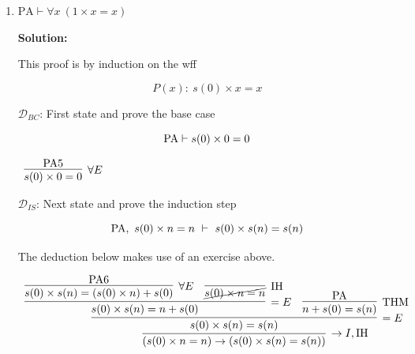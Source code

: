 \documentclass[11pt]{report}
\begin{document}
\begin{enumerate}
\begin{enumerate}
		$\mathcal{D}_{IS}$: Next state and prove the induction step

		$$ \PA, \ 0 \times n = 0 \ \vdash \ 0 \times s(n) = 0$$

		\begin{mdframed}
			\begin{center}
				$\begin{array}{c}
					\infer[\to I, \IH]{(0 \times n = 0) \to (0 \times s(n) = 0)}
						{\infer[=E]{0 \times s(n) = 0}
							{\infer[=E]{0 \times s(n) = 0 \times n}
								{\infer[\forall E]{0 \times s(n) = 0 \times n + 0}{\PA 6}
								&
								\infer[\forall E]{0 \times n + 0 = 0\times n}{\PA 3}}
							&
							\infer[\IH]{\cancel{0 \times n = 0}}{}}}
				\end{array}$
			\end{center}
		\end{mdframed}
		
		\newpage
		\item $\text{PA} \vdash \forall x \ (1 \times x = x)$

		{\bf Solution:} 

		This proof is by induction on the wff 

		$$ P(x) : \ s(0) \times x = x$$

		$\mathcal{D}_{BC}$: First state and prove the base case 

		$$ \text{PA} \vdash s(0) \times 0 = 0$$

		\begin{mdframed}
			\begin{center}
				$\begin{array}{c}
					\infer[\forall E]{s(0)\times 0 = 0}
						{\PA 5}
				\end{array}$
			\end{center}
		\end{mdframed}

		$\mathcal{D}_{IS}$: Next state and prove the induction step

		$$ \PA, \ s(0)\times n = n \ \vdash \ s(0)\times s(n) = s(n)$$

		The deduction below makes use of an exercise above. 

		\begin{mdframed}
			\begin{center}
				\footnotesize{$\begin{array}{c}
					\infer[\to I, \IH]{(s(0)\times n = n) \to (s(0)\times s(n) = s(n))}
						{\infer[=E]{s(0)\times s(n) = s(n)}
							{\infer[=E]{s(0)\times s(n) = n + s(0)}
								{\infer[\forall E]{s(0)\times s(n)= (s(0)\times n) + s(0)}{\PA 6}
								&
								\infer[\IH]{\cancel{s(0)\times n = n}}{}}
							&
							\infer[\THM]{n + s(0) = s(n)}{\PA}}}
				\end{array}$}
			\end{center}
		\end{mdframed}
		

\end{enumerate}
\end{enumerate}
\end{document}

